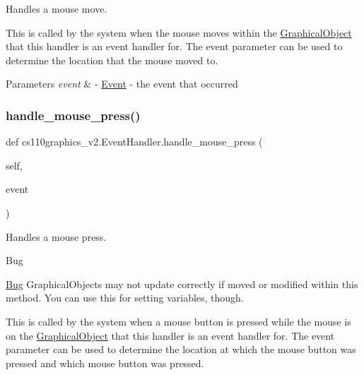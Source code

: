 Handles a mouse move. 

This is called by the system when the mouse moves within the \mbox{\hyperlink{classcs110graphics__v2_1_1GraphicalObject}{Graphical\+Object}} that this handler is an event handler for. The event parameter can be used to determine the location that the mouse moved to. 
\begin{DoxyCode}{0}
\end{DoxyCode}
 
\begin{DoxyParams}{Parameters}
{\em event} & -\/ \mbox{\hyperlink{classcs110graphics__v2_1_1Event}{Event}} -\/ the event that occurred \\
\hline
\end{DoxyParams}
\mbox{\label{classcs110graphics__v2_1_1EventHandler_ab7da753bd26e28aed9bce86968314ae1}} 
\subsubsection{\texorpdfstring{handle\_mouse\_press()}{handle\_mouse\_press()}}
{\footnotesize\ttfamily def cs110graphics\+\_\+v2.\+Event\+Handler.\+handle\+\_\+mouse\+\_\+press (\begin{DoxyParamCaption}\item[{}]{self,  }\item[{}]{event }\end{DoxyParamCaption})}



Handles a mouse press. 

\begin{DoxyRefDesc}{Bug}
\item[\mbox{\hyperlink{bug__bug000002}{Bug}}]Graphical\+Objects may not update correctly if moved or modified within this method. You can use this for setting variables, though.\end{DoxyRefDesc}


This is called by the system when a mouse button is pressed while the mouse is on the \mbox{\hyperlink{classcs110graphics__v2_1_1GraphicalObject}{Graphical\+Object}} that this handler is an event handler for. The event parameter can be used to determine the location at which the mouse button was pressed and which mouse button was pressed. 
\begin{DoxyCode}{0}
\end{DoxyCode}
 
